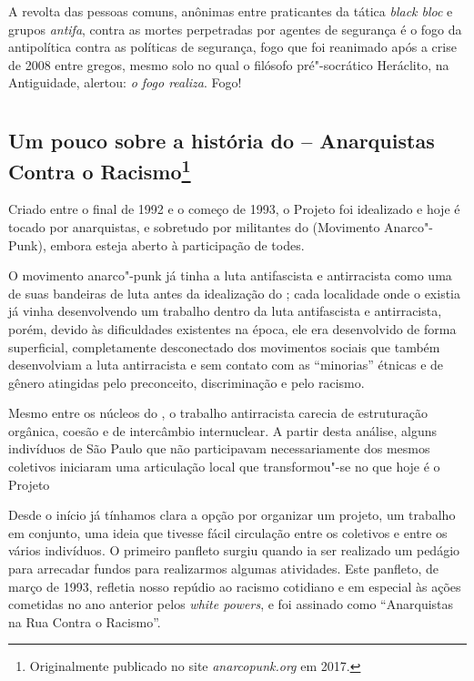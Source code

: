 A revolta das pessoas comuns, anônimas entre praticantes da tática
\emph{black bloc} e grupos \emph{antifa}, contra as mortes perpetradas
por agentes de segurança é o fogo da antipolítica contra as políticas de
segurança, fogo que foi reanimado após a crise de 2008 entre gregos,
mesmo solo no qual o filósofo pré"-socrático Heráclito, na Antiguidade,
alertou: \emph{o fogo realiza}. Fogo!


\part{}

\chapter[Um pouco sobre a história do \versal{ACR}]{Um pouco sobre a história do  -- Anarquistas Contra o Racismo\footnote[*]{Originalmente publicado no site \emph{anarcopunk.org} em 2017.}}
\label{acr}

Criado entre o final de 1992 e o começo de 1993, o Projeto  foi idealizado e hoje é tocado por anarquistas, e sobretudo por militantes do  (Movimento Anarco"-Punk), embora esteja aberto à participação de todes.

O movimento anarco"-punk já tinha a luta antifascista e antirracista como uma de suas bandeiras de luta antes da idealização do ; cada localidade onde o  existia já vinha desenvolvendo um trabalho dentro da luta antifascista e antirracista, porém, devido às dificuldades existentes na época, ele era desenvolvido de forma superficial, completamente desconectado dos movimentos sociais que também desenvolviam a luta antirracista e sem contato com as ``minorias'' étnicas e de gênero atingidas pelo preconceito, discriminação e pelo racismo.

Mesmo entre os núcleos do , o trabalho antirracista carecia de estruturação orgânica, coesão e de intercâmbio internuclear. A partir desta análise, alguns indivíduos de São Paulo que não participavam necessariamente dos mesmos coletivos iniciaram uma articulação local que transformou"-se no que hoje é o Projeto 

Desde o início já tínhamos clara a opção por organizar um projeto, um trabalho em conjunto, uma ideia que tivesse fácil circulação entre os coletivos e entre os vários indivíduos. O primeiro panfleto surgiu quando ia ser realizado um pedágio para arrecadar fundos para realizarmos algumas atividades. Este panfleto, de março de 1993, refletia nosso repúdio ao racismo cotidiano e em especial às ações cometidas no ano anterior pelos \emph{white powers}, e foi assinado como ``Anarquistas na Rua Contra o Racismo''.

